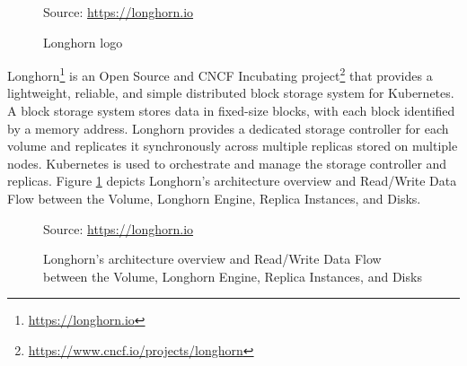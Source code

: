 \begin{figure} %
  \centering
  \def\stackalignment{r} %
  {\scriptsize \parbox[t]{\linewidth}{ Source: \url{https://longhorn.io}} }
  \caption{Longhorn logo}
\end{figure}

Longhorn\footnote{\url{https://longhorn.io}} is an Open Source and CNCF
Incubating project\footnote{\url{https://www.cncf.io/projects/longhorn}} that
provides a lightweight, reliable, and simple distributed block storage system
for Kubernetes\cite{longhorn}. A block storage system stores data in fixed-size
blocks, with each block identified by a memory address\cite{block_storage}. Longhorn
provides a dedicated storage controller for each volume and replicates it synchronously
across multiple replicas stored on multiple nodes. Kubernetes is used to
orchestrate and manage the storage controller and replicas\cite{longhorn_architecture}.
Figure \ref{fig:longhorn} depicts Longhorn's architecture overview and Read/Write
Data Flow between the Volume, Longhorn Engine, Replica Instances, and Disks.

\begin{figure}[htbp]
  \centering
  \def\stackalignment{r} %
  {\scriptsize Source: \url{https://longhorn.io} }
  \caption{Longhorn's
  architecture
  overview
  and
  Read/Write
  Data
  Flow
  between
  the
  Volume,
  Longhorn
  Engine,
  Replica
  Instances,
  and
  Disks}
  \label{fig:longhorn}
\end{figure}

